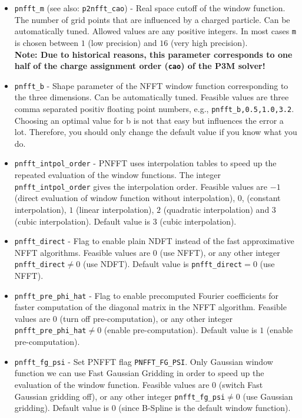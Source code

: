 \begin{itemize}
  \item \verb!pnfft_m! (see also: \verb!p2nfft_cao!) -
    Real space cutoff of the window function. The number of grid points that are influenced
    by a charged particle. Can be automatically tuned. Allowed values are any positive integers.
    In most cases \verb!m! is chosen between $1$ (low precision) and $16$ (very high precision).\\
    {\bfseries Note: Due to historical reasons, this parameter corresponds to one half of the charge assignment order
    (\verb!cao!) of the P3M solver!}
  \item \verb!pnfft_b! -
    Shape parameter of the NFFT window function corresponding to the three dimensions. Can be automatically tuned.
    Feasible values are three comma separated positiv floating point numbers, e.g., \verb!pnfft_b,0.5,1.0,3.2!.
    Choosing an optimal value for b is not that easy but influences the error a lot.
    Therefore, you should only change the default value if you know what you do.
  \item \verb!pnfft_intpol_order! -
    PNFFT uses interpolation tables to speed up the repeated evaluation of the window functions. The integer \verb!pnfft_intpol_order! gives the interpolation order.
    Feasible values are $-1$ (direct evaluation of window function without interpolation), $0$, (constant interpolation), $1$ (linear interpolation), $2$ (quadratic interpolation) and $3$ (cubic interpolation).
    Default value is $3$ (cubic interpolation).
  \item \verb!pnfft_direct! -
    Flag to enable plain NDFT instead of the fast approximative NFFT algorithms. 
    Feasible values are $0$ (use NFFT), or any other integer \verb!pnfft_direct!$\ne0$ (use NDFT). Default value is \verb!pnfft_direct!$=0$ (use NFFT).
  \item \verb!pnfft_pre_phi_hat! -
    Flag to enable precomputed Fourier coefficients for faster computation of the diagonal matrix in the NFFT algorithm.
    Feasible values are $0$ (turn off pre-computation), or any other integer \verb!pnfft_pre_phi_hat!$\ne0$ (enable pre-computation).
    Default value is $1$ (enable pre-computation).
  \item \verb!pnfft_fg_psi! -
    Set PNFFT flag \verb!PNFFT_FG_PSI!. Only Gaussian window function we can use Fast Gaussian Gridding in order to speed up the evaluation of the window function.
    Feasible values are $0$ (switch Fast Gaussian gridding off), or any other integer \verb!pnfft_fg_psi!$\ne0$ (use Gaussian gridding).
    Default value is $0$ (since B-Spline is the default window function).

\end{itemize}
